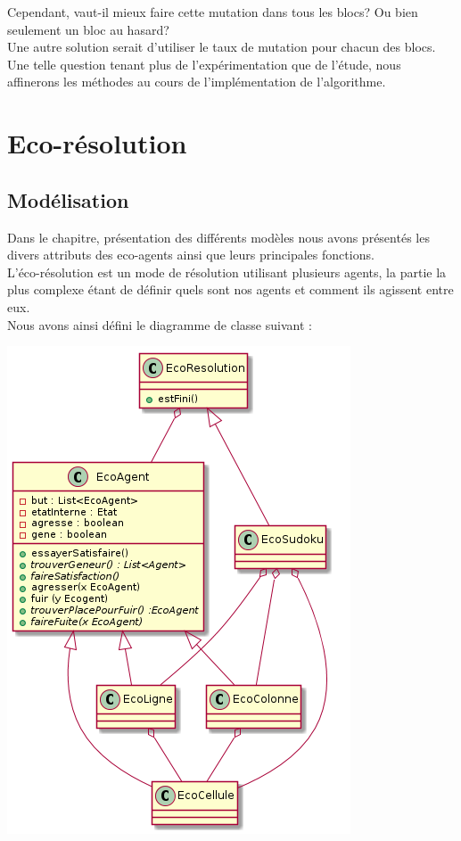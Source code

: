                 Cependant, vaut-il mieux faire cette mutation dans tous les blocs? Ou bien seulement un bloc au hasard?\\
                Une autre solution serait d'utiliser le taux de mutation pour chacun des blocs.\\

                Une telle question tenant plus de l'expérimentation que de l'étude, nous affinerons les méthodes au cours de l'implémentation de l'algorithme.
    \section{Eco-résolution}
    \subsection{Modélisation}
    Dans le chapitre, présentation des différents modèles nous avons présentés les divers attributs des eco-agents ainsi que leurs principales fonctions. \\
    L'éco-résolution est un mode de résolution utilisant plusieurs agents, la partie la plus complexe étant de définir quels sont nos agents et comment ils agissent entre eux. \\
    Nous avons ainsi défini le diagramme de classe suivant : \\
    \begin{center}
    \includegraphics[scale=0.7]{diagrams/ecoResolution.png}
    \end{center} 

